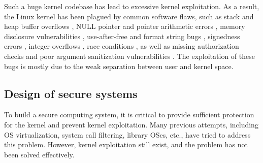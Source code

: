 Such a huge kernel codebase has lead to excessive kernel exploitation. As a result, the Linux kernel 
has been plagued by common software flaws, such as stack and heap buffer overflows 
\cite{CVE:20093234, CVE:20131828, CVE:20132892}, NULL pointer and pointer arithmetic errors 
\cite{CVE:20050736, CVE:20092698}, memory disclosure vulnerabilities 
\cite{CVE:20093002, CVE:20104073}, use-after-free and format string bugs 
\cite{CVE:20132852, CVE:20134343}, signedness errors \cite{CVE:20103437, CVE:20132094}, 
integer overflows \cite{CVE:20050736, CVE:20102959}, race conditions 
\cite{CVE:20091527, CVE:20093547}, as well as missing authorization checks and 
poor argument sanitization vulnerabilities 
\cite{CVE:20103904, CVE:20104347, CVE:20120946, CVE:20130268}. 
The exploitation of these bugs is mostly 
due to the weak separation between user and kernel space.

\subsection{Design of secure systems}
To build a secure computing system, it is critical to provide sufficient protection for the kernel and 
prevent kernel exploitation. Many previous attempts, including OS virtualization, 
system call filtering, library OSes, etc., have tried to address this problem. However, 
kernel exploitation still exist, and the problem has not been solved 
effectively.

